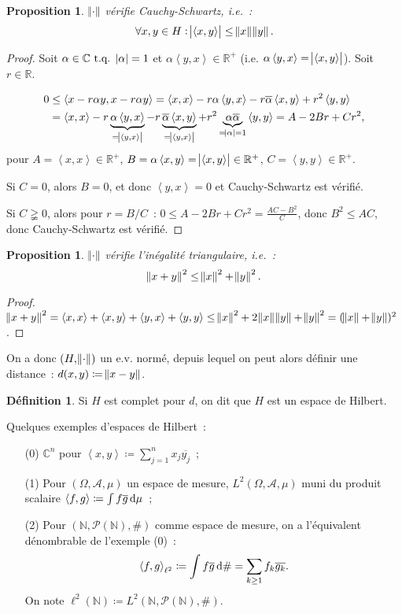 \documentclass{report}
\newcommand{\C}{{\mathbb C}}
\newcommand{\R}{{\mathbb R}}
\newcommand{\N}{{\mathbb N}}
\newcommand{\scpr}[2]{\left\langle#1, #2\right\rangle}
\newcommand{\tq}{\text{ t.q. }}
\newtheorem{prp}[thm]{Proposition}
\theoremstyle{definition}
\newtheorem{déf}[thm]{Définition}
\theoremstyle{remark}
\begin{document}
\begin{prp} $\norm \cdot$ vérifie Cauchy-Schwartz, i.e.~:
\[\forall x, y \in H : \abs {\scpr xy} \leq \norm x\norm y.\]
\end{prp}

\begin{proof} Soit $\alpha \in \C \tq \abs \alpha = 1$ et $\alpha\scpr yx \in \R^+$ (i.e. $\alpha\scpr yx = \abs {\scpr xy}$). Soit $r \in \R$.

\begin{align*}
	0 &\leq \scpr {x-r\alpha y}{x-r\alpha y} = \scpr xx - r\alpha\scpr yx - r\overline \alpha\scpr xy + r^2\scpr yy \\
		&= \scpr xx - r\underbrace {\alpha \scpr yx}_{= \abs {\scpr yx}} - r\underbrace {\overline \alpha \scpr xy}_{= \abs {\scpr yx}} + r^2\underbrace {\alpha\overline\alpha}_{= \abs \alpha = 1} \scpr yy = A - 2Br + Cr^2,
\end{align*}
pour $A = \scpr xx \in \R^+$, $B = \alpha\scpr xy = \abs {\scpr xy} \in \R^+$, $C = \scpr yy \in \R^+$.

Si $C = 0$, alors $B = 0$, et donc $\scpr yx = 0$ et Cauchy-Schwartz est vérifié.

Si $C \gneqq 0$, alors pour $r = B/C$~: $0 \leq A - 2Br + Cr^2 = \frac {AC-B^2}C$, donc $B^2 \leq AC$, donc Cauchy-Schwartz est vérifié.
\end{proof}

\begin{prp} $\norm \cdot$ vérifie l'inégalité triangulaire, i.e.~:
\[\norm {x+y}^2 \leq \norm x^2 + \norm y^2.\]
\end{prp}

\begin{proof} $\norm {x+y}^2 = \scpr xx + \scpr xy + \scpr yx + \scpr yy \leq \norm x^2 + 2\norm x\norm y + \norm y^2 = (\norm x + \norm y)^2$.
\end{proof}

On a donc $(H, \norm \cdot)$ un e.v. normé, depuis lequel on peut alors définir une distance~: $d(x, y) \coloneqq \norm {x-y}$.

\begin{déf} Si $H$ est complet pour $d$, on dit que $H$ est un espace de Hilbert.
\end{déf}

Quelques exemples d'espaces de Hilbert~:
\begin{itemize}
	\item[(0)] $\C^n$ pour $\scpr xy \coloneqq \sum_{j=1}^nx_j\overline {y_j}$~;
	\item[(1)] Pour $(\Omega, \mathcal A, \mu)$ un espace de mesure, $L^2(\Omega, \mathcal A, \mu)$ muni du produit scalaire $\scpr fg \coloneqq \int f\overline g\dif\mu$~;
	\item[(2)] Pour $(\N, \mathcal P(\N), \#)$ comme espace de mesure, on a l'équivalent dénombrable de l'exemple (0)~:
	\[\scpr fg_{\ell^2} \coloneqq \int f\overline g\dif\# = \sum_{k \geq 1}f_k\overline {g_k}.\]
	On note $\ell^2(\N) \coloneqq L^2(\N, \mathcal P(\N), \#)$.
\end{itemize}
\end{document}
